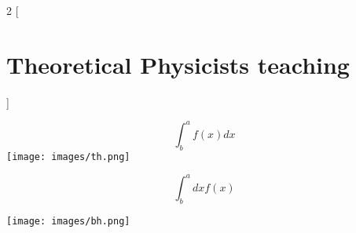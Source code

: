\documentclass{article}
\begin{document}
\begin{multicols}{2}
[
\section{Theoretical Physicists teaching}
] 


\begin{equation}
    \int^a_b f(x)dx
\end{equation}
\texttt{[image: images/th.png]}

\columnbreak

\begin{equation}
    \int^a_b dxf(x)
\end{equation}

\texttt{[image: images/bh.png]}



\end{multicols}
\end{document}
